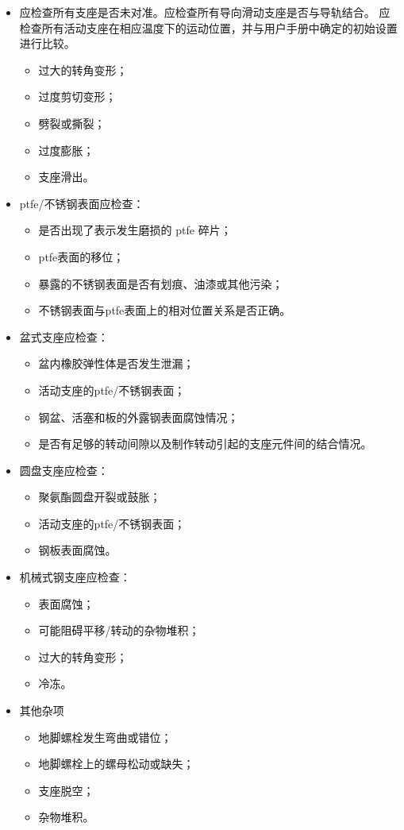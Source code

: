 \begin{itemize}
  \item 应检查所有支座是否未对准。应检查所有导向滑动支座是否与导轨结合。 应检查所有活动支座在相应温度下的运动位置，并与用户手册中确定的初始设置进行比较。
  \begin{itemize}
    \item 过大的转角变形；
    \item 过度剪切变形；
    \item 劈裂或撕裂；
    \item 过度膨胀；
    \item 支座滑出。
  \end{itemize}
  \item \acrlong*{ptfe}/不锈钢表面应检查：
  \begin{itemize}
    \item 是否出现了表示发生磨损的 \acrlong*{ptfe} 碎片；
    \item \acrlong*{ptfe}表面的移位；
    \item 暴露的不锈钢表面是否有划痕、油漆或其他污染； 
    \item 不锈钢表面与\acrlong*{ptfe}表面上的相对位置关系是否正确。
  \end{itemize}
  \item 盆式支座应检查：
  \begin{itemize}
    \item 盆内橡胶弹性体是否发生泄漏；
    \item 活动支座的\acrlong*{ptfe}/不锈钢表面；
    \item 钢盆、活塞和板的外露钢表面腐蚀情况；
    \item 是否有足够的转动间隙以及制作转动引起的支座元件间的结合情况。
  \end{itemize}
  \item 圆盘支座应检查：
  \begin{itemize}
    \item 聚氨酯圆盘开裂或鼓胀；
    \item 活动支座的\acrlong*{ptfe}/不锈钢表面；
    \item 钢板表面腐蚀。
  \end{itemize}
  \item 机械式钢支座应检查：
  \begin{itemize}
    \item 表面腐蚀；
    \item 可能阻碍平移/转动的杂物堆积；
    \item 过大的转角变形；
    \item 冷冻。
  \end{itemize}
  \item 其他杂项
  \begin{itemize}
    \item 地脚螺栓发生弯曲或错位；
    \item 地脚螺栓上的螺母松动或缺失；
    \item 支座脱空；
    \item 杂物堆积。
  \end{itemize}
\end{itemize}

